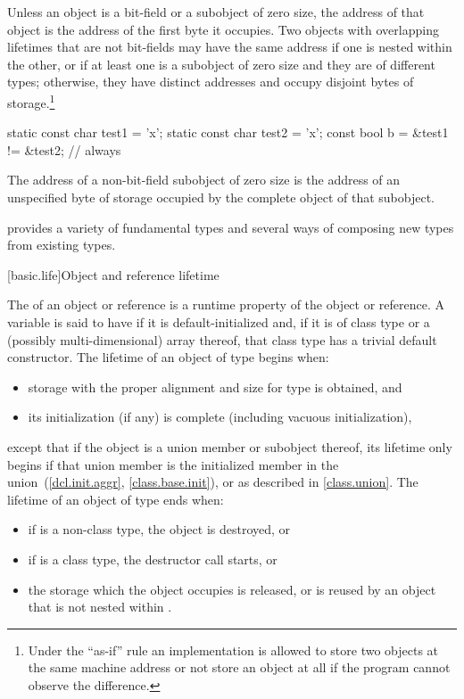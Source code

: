 \pnum
{}%
%
Unless an object is a bit-field or a subobject of zero size, the
address of that object is the address of the first byte it occupies.
Two objects
with overlapping lifetimes
that are not bit-fields
may have the same address
if one is nested within the other,
or
if at least one is a subobject of zero size
and they are of different types;
otherwise, they have distinct addresses
and occupy disjoint bytes of storage.\footnote{Under the ``as-if'' rule an
implementation is allowed to store two objects at the same machine address or
not store an object at all if the program cannot observe the
difference.}
\begin{example}
\begin{codeblock}
static const char test1 = 'x';
static const char test2 = 'x';
const bool b = &test1 != &test2;        // always 
\end{codeblock}
\end{example}
The address of a non-bit-field subobject of zero size is
the address of an unspecified byte of storage
occupied by the complete object of that subobject.

\pnum
\begin{note}
\Cpp{} provides a variety of fundamental types and several ways of composing
new types from existing types.
\end{note}%

[basic.life]{Object and reference lifetime}

\pnum
{}%
The  of an object or reference is a runtime property of the
object or reference.
%
A variable is said to have 
if it is default-initialized and,
if it is of class type or a (possibly multi-dimensional) array thereof,
that class type has a trivial default constructor.
The lifetime of an object of type  begins when:
\begin{itemize}
\item storage with the proper alignment and size
  for type  is obtained, and
\item its initialization (if any) is complete
  (including vacuous initialization),
\end{itemize}
except that if the object is a union member or subobject thereof,
its lifetime only begins if that union member is the
initialized member in the union~(\ref{dcl.init.aggr}, \ref{class.base.init}),
or as described in \ref{class.union}.
The lifetime of an object  of type  ends when:
\begin{itemize}
\item if  is a non-class type, the object is destroyed, or
\item if  is a class type, the destructor call starts, or
\item the storage which the object occupies is released,
or is reused by an object that is not nested within .
\end{itemize}

